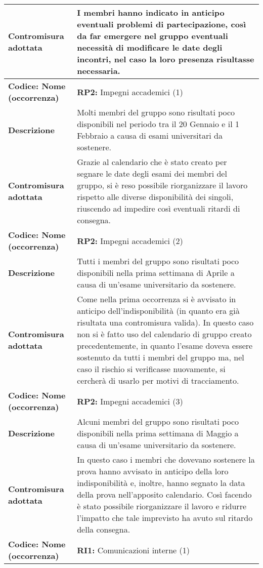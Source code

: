 {\begin{longtable}{C{3.5cm} | C{11cm}}
\textbf{Contromisura adottata} & I membri hanno indicato in anticipo eventuali problemi di partecipazione, così da far emergere nel gruppo eventuali necessità di modificare le date degli incontri, nel caso la loro presenza risultasse necessaria.\\
\hline
{}\textbf{Codice: Nome (occorrenza)} & \textbf{RP2: }{Impegni accademici (1)}\\ 
\textbf{Descrizione} & Molti membri del gruppo sono risultati poco disponibili nel periodo tra il 20 Gennaio e il 1 Febbraio a causa di esami universitari da sostenere.\\
\textbf{Contromisura adottata} & Grazie al calendario che è stato creato per segnare le date degli esami dei membri del gruppo, si è reso possibile riorganizzare il lavoro rispetto alle diverse disponibilità dei singoli, riuscendo ad impedire così eventuali ritardi di consegna.\\
\hline
\hline
{}\textbf{Codice: Nome (occorrenza)} & \textbf{RP2: }{Impegni accademici (2)}\\ 
\textbf{Descrizione} & Tutti i membri del gruppo sono risultati poco disponibili nella prima settimana di Aprile a causa di un'esame universitario da sostenere.\\
\textbf{Contromisura adottata} & Come nella prima occorrenza si è avvisato in anticipo dell'indisponibilità (in quanto era già risultata una contromisura valida). 
In questo caso non si è fatto uso del calendario di gruppo creato precedentemente, in quanto l'esame doveva essere sostenuto da tutti i membri del gruppo ma, nel caso il rischio si verificasse nuovamente, si cercherà di usarlo per motivi di tracciamento.\\
\hline
{}\textbf{Codice: Nome (occorrenza)} & \textbf{RP2: }{Impegni accademici (3)}\\ 
\textbf{Descrizione} & Alcuni membri del gruppo sono risultati poco disponibili nella prima settimana di Maggio a causa di un'esame universitario da sostenere.\\
\textbf{Contromisura adottata} & In questo caso i membri che dovevano sostenere la prova hanno avvisato in anticipo della loro indisponibilità e, inoltre, hanno segnato la data della prova nell'apposito calendario. 
Così facendo è stato possibile riorganizzare il lavoro e ridurre l'impatto che tale imprevisto ha avuto sul ritardo della consegna.\\
\hline
{}\textbf{Codice: Nome (occorrenza)} & \textbf{RI1: }{Comunicazioni interne (1)}\\

\end{longtable}}
